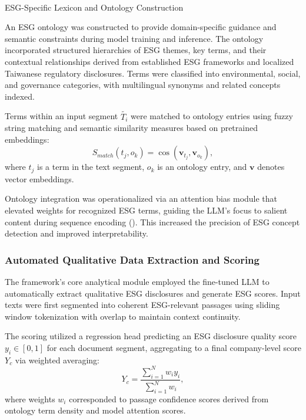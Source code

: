 \documentclass[
  12pt,
]{article}
\makeatletter
\let\oldparagraph\paragraph
\renewcommand{\paragraph}{
    \@ifstar
      \xxxParagraphStar
      \xxxParagraphNoStar
  }
\newcommand{\xxxParagraphStar}[1]{\oldparagraph*{#1}\mbox{}}
\newcommand{\xxxParagraphNoStar}[1]{\oldparagraph{#1}\mbox{}}
\makeatother
\begin{document}
\paragraph{ESG-Specific Lexicon and Ontology
Construction}\label{esg-specific-lexicon-and-ontology-construction}

An ESG ontology was constructed to provide domain-specific guidance and
semantic constraints during model training and inference. The ontology
incorporated structured hierarchies of ESG themes, key terms, and their
contextual relationships derived from established ESG frameworks and
localized Taiwanese regulatory disclosures. Terms were classified into
environmental, social, and governance categories, with multilingual
synonyms and related concepts indexed.

Terms within an input segment \(\tilde{T_i}\) were matched to ontology
entries using fuzzy string matching and semantic similarity measures
based on pretrained embeddings: \[
S_{match}(t_j, o_k) = \cos(\mathbf{v}_{t_j}, \mathbf{v}_{o_k}),
\] where \(t_j\) is a term in the text segment, \(o_k\) is an ontology
entry, and \(\mathbf{v}\) denotes vector embeddings.

Ontology integration was operationalized via an attention bias module
that elevated weights for recognized ESG terms, guiding the LLM's focus
to salient content during sequence encoding
(). This increased the precision of ESG concept
detection and improved interpretability.

\subsubsection{Automated Qualitative Data Extraction and
Scoring}\label{automated-qualitative-data-extraction-and-scoring}

The framework's core analytical module employed the fine-tuned LLM to
automatically extract qualitative ESG disclosures and generate ESG
scores. Input texts were first segmented into coherent ESG-relevant
passages using sliding window tokenization with overlap to maintain
context continuity.

The scoring utilized a regression head predicting an ESG disclosure
quality score \(y_i \in [0,1]\) for each document segment, aggregating
to a final company-level score \(Y_c\) via weighted averaging: \[
Y_c = \frac{\sum_{i=1}^N w_i y_i}{\sum_{i=1}^N w_i},
\] where weights \(w_i\) corresponded to passage confidence scores
derived from ontology term density and model attention scores.
\end{document}
